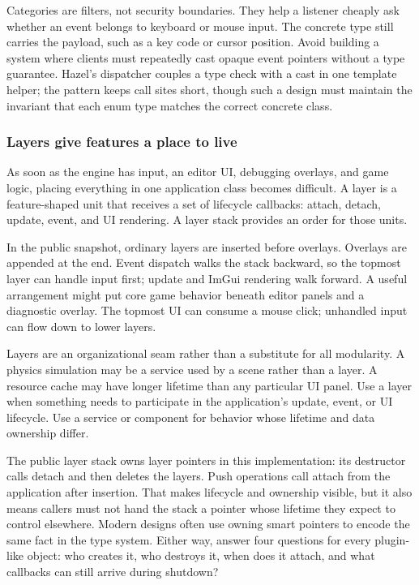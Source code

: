 Categories are filters, not security boundaries. They help a listener cheaply ask whether an event belongs to keyboard or mouse input. The concrete type still carries the payload, such as a key code or cursor position. Avoid building a system where clients must repeatedly cast opaque event pointers without a type guarantee. Hazel's dispatcher couples a type check with a cast in one template helper; the pattern keeps call sites short, though such a design must maintain the invariant that each enum type matches the correct concrete class.

\subsubsection{Layers give features a place to live}\label{layers-give-features-a-place-to-live}

As soon as the engine has input, an editor UI, debugging overlays, and game logic, placing everything in one application class becomes difficult. A layer is a feature-shaped unit that receives a set of lifecycle callbacks: attach, detach, update, event, and UI rendering. A layer stack provides an order for those units.

In the public snapshot, ordinary layers are inserted before overlays. Overlays are appended at the end. Event dispatch walks the stack backward, so the topmost layer can handle input first; update and ImGui rendering walk forward. A useful arrangement might put core game behavior beneath editor panels and a diagnostic overlay. The topmost UI can consume a mouse click; unhandled input can flow down to lower layers.

Layers are an organizational seam rather than a substitute for all modularity. A physics simulation may be a service used by a scene rather than a layer. A resource cache may have longer lifetime than any particular UI panel. Use a layer when something needs to participate in the application's update, event, or UI lifecycle. Use a service or component for behavior whose lifetime and data ownership differ.

The public layer stack owns layer pointers in this implementation: its destructor calls detach and then deletes the layers. Push operations call attach from the application after insertion. That makes lifecycle and ownership visible, but it also means callers must not hand the stack a pointer whose lifetime they expect to control elsewhere. Modern designs often use owning smart pointers to encode the same fact in the type system. Either way, answer four questions for every plugin-like object: who creates it, who destroys it, when does it attach, and what callbacks can still arrive during shutdown?


